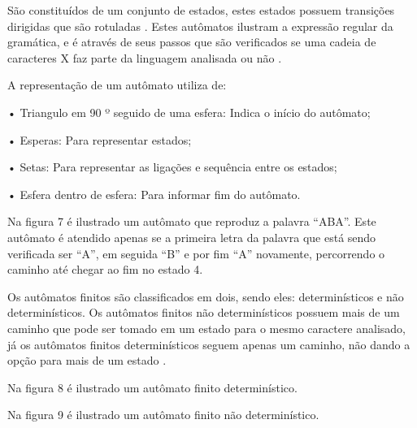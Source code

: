 \documentclass[12pt,oneside,a4paper,chapter=TITLE,section=TITLE,sumario=tradicional]{abntex2}
\begin{document}
São constituídos de um conjunto de estados, estes estados possuem transições dirigidas que são rotuladas \cite{pedro2018}. Estes autômatos ilustram a expressão regular da gramática, e é através de seus passos que são verificados se uma cadeia de caracteres X faz parte da linguagem analisada ou não \cite{alfred1995}.

A representação de um autômato utiliza de:

•	Triangulo em 90 º seguido de uma esfera: Indica o início do autômato;

•	Esperas: Para representar estados;

•	Setas: Para representar as ligações e sequência entre os estados;

•	Esfera dentro de esfera: Para informar fim do autômato.

Na figura 7 é ilustrado um autômato que reproduz a palavra “ABA”. Este autômato é atendido apenas se a primeira letra da palavra que está sendo verificada ser “A”, em seguida “B” e por fim “A” novamente, percorrendo o caminho até chegar ao fim no estado 4.

\begin{figure}[htb]
\end{figure}

Os autômatos finitos são classificados em dois, sendo eles: determinísticos e não determinísticos. Os autômatos finitos não determinísticos possuem mais de um caminho que pode ser tomado em um estado para o mesmo caractere analisado, já os autômatos finitos determinísticos seguem apenas um caminho, não dando a opção para mais de um estado \cite{alfred1995}.

Na figura 8 é ilustrado um autômato finito determinístico.

\begin{figure}[H]
\end{figure}

Na figura 9 é ilustrado um autômato finito não determinístico.

\begin{figure}[H]
\end{figure}
\end{document}
